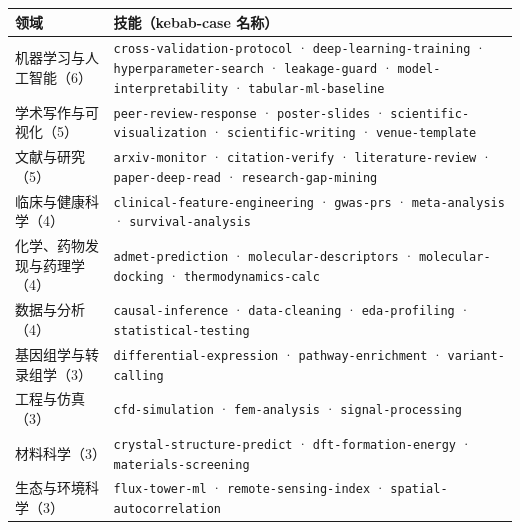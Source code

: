 \begin{center}
\begin{tabular}{@{}>{\raggedright\arraybackslash}p{3.0cm} >{\raggedright\arraybackslash}p{12.2cm}@{}}
\toprule
\textbf{领域} & \textbf{技能（kebab-case 名称）} \\
\midrule
机器学习与人工智能（6） & \texttt{cross-validation-protocol} \textcolor{ink3}{·} \texttt{deep-learning-training} \textcolor{ink3}{·} \texttt{hyperparameter-search} \textcolor{ink3}{·} \texttt{leakage-guard} \textcolor{ink3}{·} \texttt{model-interpretability} \textcolor{ink3}{·} \texttt{tabular-ml-baseline} \\[0.2em]
学术写作与可视化（5） & \texttt{peer-review-response} \textcolor{ink3}{·} \texttt{poster-slides} \textcolor{ink3}{·} \texttt{scientific-visualization} \textcolor{ink3}{·} \texttt{scientific-writing} \textcolor{ink3}{·} \texttt{venue-template} \\[0.2em]
文献与研究（5） & \texttt{arxiv-monitor} \textcolor{ink3}{·} \texttt{citation-verify} \textcolor{ink3}{·} \texttt{literature-review} \textcolor{ink3}{·} \texttt{paper-deep-read} \textcolor{ink3}{·} \texttt{research-gap-mining} \\[0.2em]
临床与健康科学（4） & \texttt{clinical-feature-engineering} \textcolor{ink3}{·} \texttt{gwas-prs} \textcolor{ink3}{·} \texttt{meta-analysis} \textcolor{ink3}{·} \texttt{survival-analysis} \\[0.2em]
化学、药物发现与药理学（4） & \texttt{admet-prediction} \textcolor{ink3}{·} \texttt{molecular-descriptors} \textcolor{ink3}{·} \texttt{molecular-docking} \textcolor{ink3}{·} \texttt{thermodynamics-calc} \\[0.2em]
数据与分析（4） & \texttt{causal-inference} \textcolor{ink3}{·} \texttt{data-cleaning} \textcolor{ink3}{·} \texttt{eda-profiling} \textcolor{ink3}{·} \texttt{statistical-testing} \\[0.2em]
基因组学与转录组学（3） & \texttt{differential-expression} \textcolor{ink3}{·} \texttt{pathway-enrichment} \textcolor{ink3}{·} \texttt{variant-calling} \\[0.2em]
工程与仿真（3） & \texttt{cfd-simulation} \textcolor{ink3}{·} \texttt{fem-analysis} \textcolor{ink3}{·} \texttt{signal-processing} \\[0.2em]
材料科学（3） & \texttt{crystal-structure-predict} \textcolor{ink3}{·} \texttt{dft-formation-energy} \textcolor{ink3}{·} \texttt{materials-screening} \\[0.2em]
生态与环境科学（3） & \texttt{flux-tower-ml} \textcolor{ink3}{·} \texttt{remote-sensing-index} \textcolor{ink3}{·} \texttt{spatial-autocorrelation} \\[0.2em]

\end{tabular}
\end{center}
